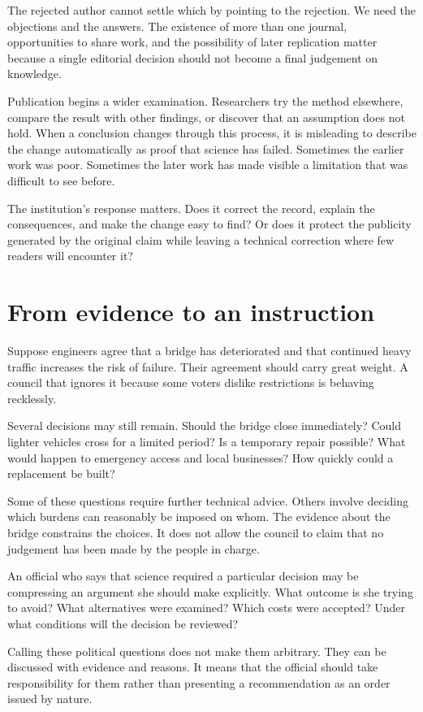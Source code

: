 \documentclass[12pt,a4paper]{book}
\begin{document}
The rejected author cannot settle which by pointing to the rejection. We need the objections and the answers. The existence of more than one journal, opportunities to share work, and the possibility of later replication matter because a single editorial decision should not become a final judgement on knowledge.

Publication begins a wider examination. Researchers try the method elsewhere, compare the result with other findings, or discover that an assumption does not hold. When a conclusion changes through this process, it is misleading to describe the change automatically as proof that science has failed. Sometimes the earlier work was poor. Sometimes the later work has made visible a limitation that was difficult to see before.

The institution's response matters. Does it correct the record, explain the consequences, and make the change easy to find? Or does it protect the publicity generated by the original claim while leaving a technical correction where few readers will encounter it?

\section*{From evidence to an instruction}

Suppose engineers agree that a bridge has deteriorated and that continued heavy traffic increases the risk of failure. Their agreement should carry great weight. A council that ignores it because some voters dislike restrictions is behaving recklessly.

Several decisions may still remain. Should the bridge close immediately? Could lighter vehicles cross for a limited period? Is a temporary repair possible? What would happen to emergency access and local businesses? How quickly could a replacement be built?

Some of these questions require further technical advice. Others involve deciding which burdens can reasonably be imposed on whom. The evidence about the bridge constrains the choices. It does not allow the council to claim that no judgement has been made by the people in charge.

An official who says that science required a particular decision may be compressing an argument she should make explicitly. What outcome is she trying to avoid? What alternatives were examined? Which costs were accepted? Under what conditions will the decision be reviewed?

Calling these political questions does not make them arbitrary. They can be discussed with evidence and reasons. It means that the official should take responsibility for them rather than presenting a recommendation as an order issued by nature.
\end{document}
